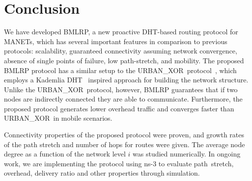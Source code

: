\documentclass[conference]{IEEEtran}
\theoremstyle{definition}
\newcommand{\urbanxor}{URBAN\_XOR}
\begin{document}
\section{Conclusion}
\label{sec:conclusion}

We have developed BMLRP, a new proactive DHT-based routing protocol for MANETs, which has several important features in comparison to previous protocols: scalability, guaranteed connectivity assuming network convergence,  absence of single points of failure, low path-stretch, and mobility. The proposed BMLRP protocol has a similar setup to the \urbanxor\ protocol~\cite{Pasquini}, which employs a Kademlia DHT~\cite{kademlia} inspired approach for building the network structure. Unlike the \urbanxor\ protocol, however, BMLRP guarantees that if two nodes are indirectly connected they are able to communicate. Furthermore, the proposed protocol generates lower overhead traffic and converges faster than \urbanxor\ in mobile scenarios.  

Connectivity properties of the proposed protocol were proven, and growth rates of the path stretch and number of hops for routes were given. The average node degree as a function of the network level $i$ was studied numerically. In ongoing work, we are implementing the protocol using ns-3 to evaluate path~stretch, overhead, delivery ratio and other properties through simulation.




\end{document}
